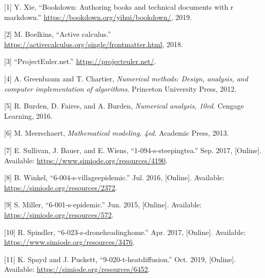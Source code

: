 \documentclass[
]{book}
\newenvironment{cslreferences}%
  {}%
  {\par}
\theoremstyle{definition}
\theoremstyle{definition}
\theoremstyle{definition}
\theoremstyle{remark}
\begin{document}
\hypertarget{refs}{}
\begin{cslreferences}
\leavevmode\hypertarget{ref-R-bookdown}{}%
{[}1{]} Y. Xie, ``Bookdown: Authoring books and technical documents with r markdown.'' \url{https://bookdown.org/yihui/bookdown/}, 2019.

\leavevmode\hypertarget{ref-active-calculus}{}%
{[}2{]} M. Boelkins, ``Active calculus.'' \url{https://activecalculus.org/single/frontmatter.html}, 2018.

\leavevmode\hypertarget{ref-euler}{}%
{[}3{]} ``ProjectEuler.net.'' \url{https://projecteuler.net/}.

\leavevmode\hypertarget{ref-chartier}{}%
{[}4{]} A. Greenbaum and T. Chartier, \emph{Numerical methods: Design, analysis, and computer implementation of algorithms}. Princeton University Press, 2012.

\leavevmode\hypertarget{ref-burden}{}%
{[}5{]} R. Burden, D. Faires, and A. Burden, \emph{Numerical analysis, 10ed}. Cengage Learning, 2016.

\leavevmode\hypertarget{ref-meerschaert}{}%
{[}6{]} M. Meerschaert, \emph{Mathematical modeling, 4ed}. Academic Press, 2013.

\leavevmode\hypertarget{ref-tea}{}%
{[}7{]} E. Sullivan, J. Bauer, and E. Wiens, ``1-094-s-steepingtea.'' Sep. 2017, {[}Online{]}. Available: \url{https://www.simiode.org/resources/4190}.

\leavevmode\hypertarget{ref-plague}{}%
{[}8{]} B. Winkel, ``6-004-s-villageepidemic.'' Jul. 2016, {[}Online{]}. Available: \url{https://simiode.org/resources/2372}.

\leavevmode\hypertarget{ref-bedridden}{}%
{[}9{]} S. Miller, ``6-001-s-epidemic.'' Jun. 2015, {[}Online{]}. Available: \url{https://simiode.org/resources/572}.

\leavevmode\hypertarget{ref-drone}{}%
{[}10{]} R. Spindler, ``6-023-s-droneheadinghome.'' Apr. 2017, {[}Online{]}. Available: \url{https://www.simiode.org/resources/3476}.

\leavevmode\hypertarget{ref-simiodeheat}{}%
{[}11{]} K. Spayd and J. Puckett, ``9-020-t-heatdiffusion.'' Oct. 2019, {[}Online{]}. Available: \url{https://simiode.org/resources/6452}.
\end{cslreferences}
\end{document}
